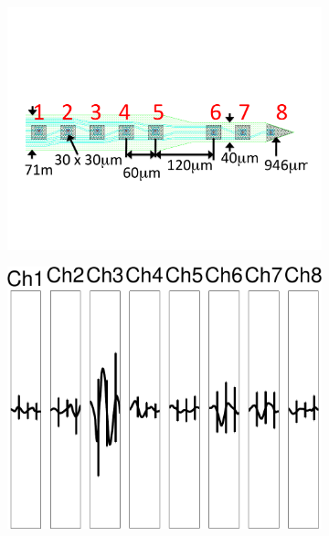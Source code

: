 \begin{center}
\begin{figure}
\begin{subfigure}[b]{.24\textwidth}
\includegraphics[width=\textwidth]{../figs/8dev}
\caption{}
\label{3dev}
\end{subfigure}
\begin{subfigure}[b]{.24\textwidth}
\includegraphics[width=\textwidth]{../figs/8devim/clus3}
\caption{}
\label{ex81}
\end{subfigure}
\begin{subfigure}[b]{.24\textwidth}

\end{subfigure}
\end{figure}
\end{center}
